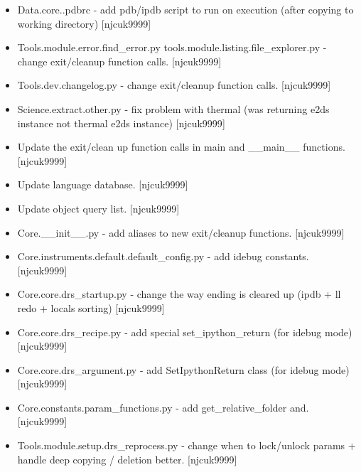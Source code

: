 \documentclass[a4paper,10pt,english]{report}
\begin{document}
\label{\detokenize{misc/changelog:id78}}\begin{itemize}
\item {} 
Data.core..pdbrc - add pdb/ipdb script to run on execution (after
copying to working directory) {[}njcuk9999{]}

\item {} 
Tools.module.error.find\_error.py
tools.module.listing.file\_explorer.py - change exit/cleanup function
calls. {[}njcuk9999{]}

\item {} 
Tools.dev.changelog.py - change exit/cleanup function calls.
{[}njcuk9999{]}

\item {} 
Science.extract.other.py - fix problem with thermal (was returning
e2ds instance not thermal e2ds instance) {[}njcuk9999{]}

\item {} 
Update the exit/clean up function calls in main and \_\_main\_\_
functions. {[}njcuk9999{]}

\item {} 
Update language database. {[}njcuk9999{]}

\item {} 
Update object query list. {[}njcuk9999{]}

\item {} 
Core.\_\_init\_\_.py - add aliases to new exit/cleanup functions.
{[}njcuk9999{]}

\item {} 
Core.instruments.default.default\_config.py - add idebug constants.
{[}njcuk9999{]}

\item {} 
Core.core.drs\_startup.py - change the way ending is cleared up (ipdb +
ll redo + locals sorting) {[}njcuk9999{]}

\item {} 
Core.core.drs\_recipe.py - add special set\_ipython\_return (for idebug
mode) {[}njcuk9999{]}

\item {} 
Core.core.drs\_argument.py - add SetIpythonReturn class (for idebug
mode) {[}njcuk9999{]}

\item {} 
Core.constants.param\_functions.py - add get\_relative\_folder and.
{[}njcuk9999{]}

\item {} 
Tools.module.setup.drs\_reprocess.py - change when to lock/unlock
params + handle deep copying / deletion better. {[}njcuk9999{]}


\end{itemize}
\end{document}
